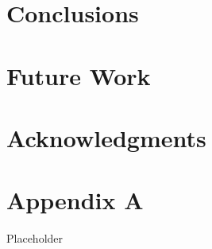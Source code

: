 \documentclass[12pt,oneside]{book}
\begin{document}
\clearpage



\chapter{Conclusions}
\label{chap:Conclusions}

\chapter{Future Work}
\label{chap:Future_Work}

\chapter{Acknowledgments}
\label{chap:Acknowledgments}



\appendix

\chapter{Appendix A}

Placeholder
\end{document}
